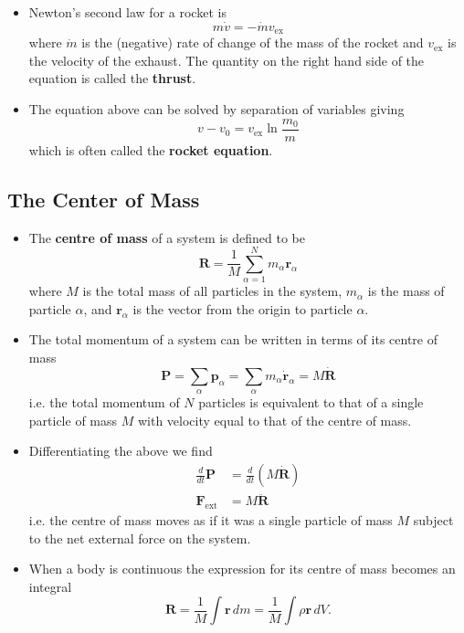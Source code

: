\documentclass{article}
\renewcommand{\vec}[1]{\boldsymbol{\mathbf{#1}}}
\newcommand{\dvec}[1]{\dot{\vec{#1}}}
\newcommand{\ddvec}[1]{\ddot{\vec{#1}}}
\begin{document}
\begin{itemize}
  \item Newton's second law for a rocket is \[m \dot{v} = -\dot{m} v_\text{ex}\] where $\dot{m}$ is the (negative) rate of change of the mass of the rocket and $v_\text{ex}$ is the velocity of the exhaust. The quantity on the right hand side of the equation is called the \textbf{thrust}.

  \item The equation above can be solved by separation of variables giving \[v - v_0 = v_\text{ex} \ln \frac{m_0}{m}\] which is often called the \textbf{rocket equation}.
\end{itemize}

\subsection{The Center of Mass}

\begin{itemize}
  \item The \textbf{centre of mass} of a system is defined to be \[\vec{R} = \frac{1}{M} \sum_{\alpha = 1}^N m_\alpha \vec{r}_\alpha\] where $M$ is the total mass of all particles in the system, $m_\alpha$ is the mass of particle $\alpha$, and $\vec{r}_\alpha$ is the vector from the origin to particle $\alpha$.

  \item The total momentum of a system can be written in terms of its centre of mass \[\vec{P} = \sum_\alpha \vec{p}_\alpha = \sum_\alpha m_\alpha \dvec{r}_\alpha = M \dvec{R}\] i.e. the total momentum of $N$ particles is equivalent to that of a single particle of mass $M$ with velocity equal to that of the centre of mass.

  \item Differentiating the above we find \begin{align*}
          \frac{d}{d t} \vec{P} & = \frac{d}{d t} (M \dvec{R}) \\
          \vec{F}_\text{ext}    & = M \ddvec{R}
        \end{align*} i.e. the centre of mass moves as if it was a single particle of mass $M$ subject to the net external force on the system.

  \item When a body is continuous the expression for its centre of mass becomes an integral \[\vec{R} = \frac{1}{M} \int \vec{r} \,d m = \frac{1}{M} \int \rho \vec{r} \,d V.\]
\end{itemize}
\end{document}
